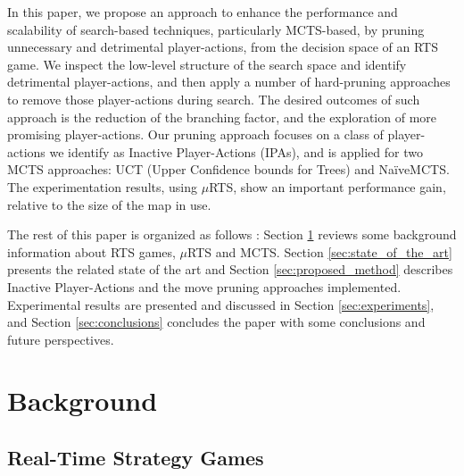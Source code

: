 \documentclass[conference]{IEEEtran}
\newcommand{\mRTS}{$\mu$RTS}
\begin{document}
In this paper, we propose an approach to enhance the performance and scalability of search-based techniques, particularly MCTS-based, by pruning unnecessary and detrimental player-actions, from the decision space of an RTS game. 
We inspect the low-level structure of the search space and identify detrimental player-actions, and then apply a number of hard-pruning approaches to remove those player-actions during search. The desired outcomes of such approach is the reduction of the branching factor, and the exploration of more promising player-actions. Our pruning approach focuses on a class of player-actions we identify as Inactive Player-Actions (IPAs), 
and is applied for two MCTS approaches: UCT (Upper Confidence bounds for Trees)
 and NaïveMCTS. The experimentation results, using \mRTS{}, show an important performance gain, relative to the size of the map in use.

The rest of this paper is organized as follows : Section \ref{sec:background} reviews some background information about RTS games, \mRTS{} and MCTS. Section \ref{sec:state_of_the_art} presents the related state of the art and Section \ref{sec:proposed_method} describes Inactive Player-Actions and the move pruning approaches implemented. Experimental results are presented and discussed in Section \ref{sec:experiments}, and Section \ref{sec:conclusions} concludes the paper with some conclusions and future perspectives.


\section{Background}
\label{sec:background}

\subsection{Real-Time Strategy Games}
\end{document}
